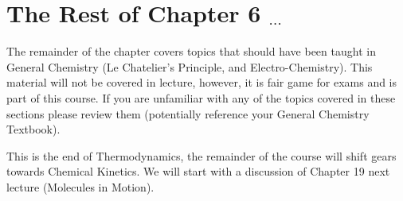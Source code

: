 \documentclass{article}
\begin{document}
\section*{The Rest of Chapter 6 $_{\cdots}$}
The remainder of the chapter covers topics that should have been taught in General Chemistry (Le Chatelier's Principle, and Electro-Chemistry). 
This material will not be covered in lecture, however, it is fair game for exams and is part of this course.
If you are unfamiliar with any of the topics covered in these sections please review them (potentially reference your General Chemistry Textbook). 

This is the end of Thermodynamics, the remainder of the course will shift gears towards Chemical Kinetics.
We will start with a discussion of Chapter 19 next lecture (Molecules in Motion). 
\end{document}
